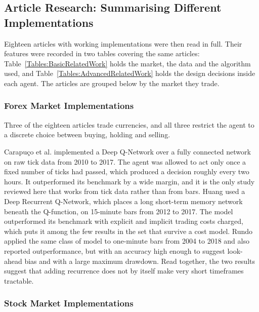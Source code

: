 \subsection{Article Research: Summarising Different Implementations}

Eighteen articles with working implementations were then read in full. Their features were recorded in two tables covering the same articles: Table~\ref{Tables:BasicRelatedWork} holds the market, the data and the algorithm used, and Table~\ref{Tables:AdvancedRelatedWork} holds the design decisions inside each agent. The articles are grouped below by the market they trade.




\subsubsection{Forex Market Implementations}

Three of the eighteen articles trade currencies, and all three restrict the agent to a discrete choice between buying, holding and selling.

Carapuço et al. \cite{carapuco_reinforcement_2018} implemented a Deep Q-Network over a fully connected network on raw tick data from 2010 to 2017. The agent was allowed to act only once a fixed number of ticks had passed, which produced a decision roughly every two hours. It outperformed its benchmark by a wide margin, and it is the only study reviewed here that works from tick data rather than from bars. Huang \cite{huang_financial_2018} used a Deep Recurrent Q-Network, which places a long short-term memory network beneath the Q-function, on 15-minute bars from 2012 to 2017. The model outperformed its benchmark with explicit and implicit trading costs charged, which puts it among the few results in the set that survive a cost model. Rundo \cite{rundo_deep_2019} applied the same class of model to one-minute bars from 2004 to 2018 and also reported outperformance, but with an accuracy high enough to suggest look-ahead bias and with a large maximum drawdown. Read together, the two results suggest that adding recurrence does not by itself make very short timeframes tractable.

\subsubsection{Stock Market Implementations}

